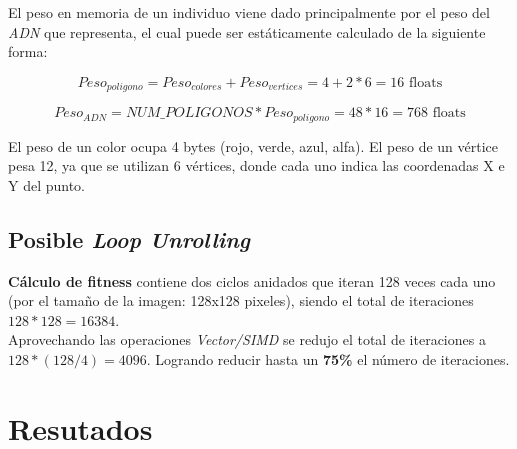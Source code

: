 \documentclass[11pt, spanish]{article}
\begin{document}
El peso en memoria de un individuo viene dado principalmente por el peso del \emph{ADN} que representa, el cual puede ser estáticamente calculado de la siguiente forma:

$$ Peso_{poligono} = Peso_{colores} + Peso_{vertices} = 4 + 2*6 = 16\textrm{ floats} $$

$$ Peso_{ADN} = NUM\_POLIGONOS * Peso_{poligono} = 48 * 16 = 768\textrm{ floats} $$

El peso de un color ocupa 4 bytes (rojo, verde, azul, alfa). El peso de un vértice pesa 12, ya que se utilizan 6 vértices, donde cada uno indica las coordenadas X e Y del punto.

\subsection{Posible \emph{Loop Unrolling}}
\textbf{Cálculo de fitness} contiene dos ciclos anidados que iteran 128 veces cada uno (por el tamaño de la imagen: 128x128 pixeles), siendo el total de iteraciones $128 * 128 = 16384$. \\

Aprovechando las operaciones \emph{Vector/SIMD} se redujo el total de iteraciones a $128 * (128/4) = 4096$. Logrando reducir hasta un \textbf{75\%} el número de iteraciones.

\section{Resutados}
\end{document}
